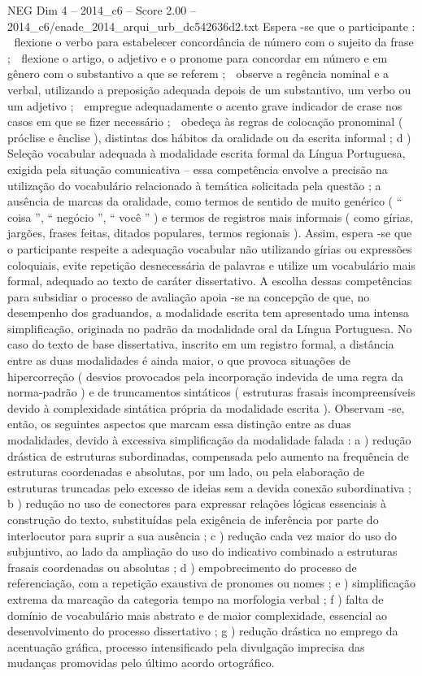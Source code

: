 \begin{textsample}{NEG Dim 4 – 2014\_c6 – Score 2.00 – 2014\_c6/enade\_2014\_arqui\_urb\_dc542636d2.txt}
Espera -se que o participante :  flexione o verbo para estabelecer concordância de número com o sujeito da frase ;  flexione o artigo, o adjetivo e o pronome para concordar em número e em gênero com o substantivo a que se referem ;  observe a regência nominal e a verbal, utilizando a preposição adequada depois de um substantivo, um verbo ou um adjetivo ;  empregue adequadamente o acento grave indicador de crase nos casos em que se fizer necessário ;  obedeça às regras de colocação pronominal ( próclise e ênclise ), distintas dos hábitos da oralidade ou da escrita informal ; d ) Seleção vocabular adequada à modalidade escrita formal da Língua Portuguesa, exigida pela situação comunicativa – essa competência envolve a precisão na utilização do vocabulário relacionado à temática solicitada pela questão ; a ausência de marcas da oralidade, como termos de sentido de muito genérico ( “ coisa ”, “ negócio ”, “ você ” ) e termos de registros mais informais ( como gírias, jargões, frases feitas, ditados populares, termos regionais ).
Assim, espera -se que o participante respeite a adequação vocabular não utilizando gírias ou expressões coloquiais, evite repetição desnecessária de palavras e utilize um vocabulário mais formal, adequado ao texto de caráter dissertativo.
A escolha dessas competências para subsidiar o processo de avaliação apoia -se na concepção de que, no desempenho dos graduandos, a modalidade escrita tem apresentado uma intensa simplificação, originada no padrão da modalidade oral da Língua Portuguesa.
No caso do texto de base dissertativa, inscrito em um registro formal, a distância entre as duas modalidades é ainda maior, o que provoca situações de hipercorreção ( desvios provocados pela incorporação indevida de uma regra da norma-padrão ) e de truncamentos sintáticos ( estruturas frasais incompreensíveis devido à complexidade sintática própria da modalidade escrita ).
Observam -se, então, os seguintes aspectos que marcam essa distinção entre as duas modalidades, devido à excessiva simplificação da modalidade falada : a ) redução drástica de estruturas subordinadas, compensada pelo aumento na frequência de estruturas coordenadas e absolutas, por um lado, ou pela elaboração de estruturas truncadas pelo excesso de ideias sem a devida conexão subordinativa ; b ) redução no uso de conectores para expressar relações lógicas essenciais à construção do texto, substituídas pela exigência de inferência por parte do interlocutor para suprir a sua ausência ; c ) redução cada vez maior do uso do subjuntivo, ao lado da ampliação do uso do indicativo combinado a estruturas frasais coordenadas ou absolutas ; d ) empobrecimento do processo de referenciação, com a repetição exaustiva de pronomes ou nomes ; e ) simplificação extrema da marcação da categoria tempo na morfologia verbal ; f ) falta de domínio de vocabulário mais abstrato e de maior complexidade, essencial ao desenvolvimento do processo dissertativo ; g ) redução drástica no emprego da acentuação gráfica, processo intensificado pela divulgação imprecisa das mudanças promovidas pelo último acordo ortográfico.

\end{textsample}
